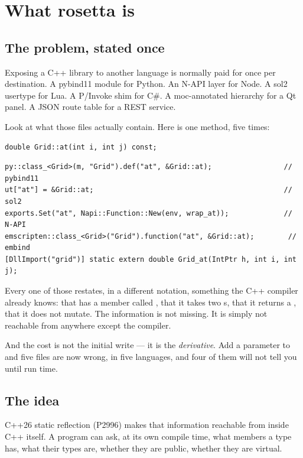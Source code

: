 \chapter{What rosetta is}
\label{ch:what}

\section{The problem, stated once}

Exposing a C++ library to another language is normally paid for once per
destination. A pybind11 module for Python. An N-API layer for Node. A sol2
usertype for Lua. A P/Invoke shim for C\#. A moc-annotated hierarchy for a Qt
panel. A JSON route table for a REST service.

Look at what those files actually contain. Here is one method, five times:

\begin{lstlisting}[style=cpp]
double Grid::at(int i, int j) const;
\end{lstlisting}

\begin{lstlisting}[style=cpp]
py::class_<Grid>(m, "Grid").def("at", &Grid::at);                 // pybind11
ut["at"] = &Grid::at;                                             // sol2
exports.Set("at", Napi::Function::New(env, wrap_at));             // N-API
emscripten::class_<Grid>("Grid").function("at", &Grid::at);        // embind
[DllImport("grid")] static extern double Grid_at(IntPtr h, int i, int j);
\end{lstlisting}

Every one of those restates, in a different notation, something the C++
compiler already knows: that  has a member called , that it
takes two s, that it returns a , that it does not
mutate. The information is not missing. It is simply not reachable from
anywhere except the compiler.

And the cost is not the initial write --- it is the \emph{derivative}. Add a
parameter to  and five files are now wrong, in five languages, and
four of them will not tell you until run time.

\section{The idea}

C++26 static reflection (P2996) makes that information reachable from inside
C++ itself. A program can ask, at its own compile time, what members a type
has, what their types are, whether they are public, whether they are virtual.

